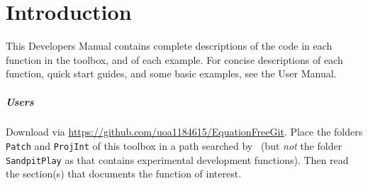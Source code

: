 \chapter{Introduction}

\begin{devMan}
This Developers Manual contains complete descriptions of the code in each function in the toolbox, and of each example.  For concise descriptions of each function, quick start guides, and some basic examples, see the User Manual.
\end{devMan}


\paragraph{Users}
Download via \url{https://github.com/uoa1184615/EquationFreeGit}.
Place the folders \verb|Patch| and \verb|ProjInt| of this toolbox in a path searched by \script\ (but \emph{not} the folder \verb|SandpitPlay| as that contains experimental development functions).
Then read the section(s) that documents the function of interest.


